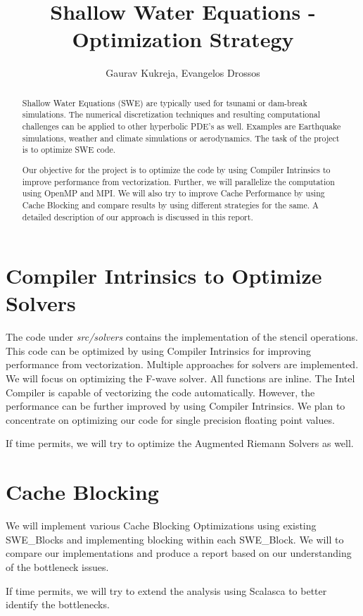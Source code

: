 \documentclass[]{article}
\title{Shallow Water Equations - Optimization Strategy}
\author{Gaurav Kukreja, Evangelos Drossos}
\begin{document}
\maketitle

\begin{abstract}
Shallow Water Equations (SWE) are typically used for tsunami or dam-break simulations.
The numerical discretization techniques and resulting computational challenges can be
applied to other hyperbolic PDE's as well. Examples are Earthquake simulations,
weather and climate simulations or aerodynamics. The task of the project is to optimize
SWE code. 

Our objective for the project is to optimize the code by using Compiler Intrinsics to
improve performance from vectorization. Further, we will parallelize the computation using
OpenMP and MPI. We will also try to improve Cache Performance by using Cache Blocking
and compare results by using different strategies for the same. A detailed description of
our approach is discussed in this report.
\end{abstract}

\section{Compiler Intrinsics to Optimize Solvers}
The code under \textit{src/solvers} contains the implementation of the stencil operations.
This code can be optimized by using Compiler Intrinsics for improving performance from vectorization.
Multiple approaches for solvers are implemented. We will focus on optimizing the 
F-wave solver. All functions are inline. The Intel Compiler is capable of vectorizing
the code automatically. However, the performance can be further improved by using Compiler
Intrinsics. We plan to concentrate on optimizing our code for single precision floating point values.

If time permits, we will try to optimize the Augmented Riemann Solvers as well.

\section{Cache Blocking}
We will implement various Cache Blocking Optimizations using existing SWE\_Blocks and
implementing blocking within each SWE\_Block. We will to compare our implementations and
produce a report based on our understanding of the bottleneck issues.

If time permits, we will try to extend the analysis using Scalasca to better identify
the bottlenecks.
\end{document}

